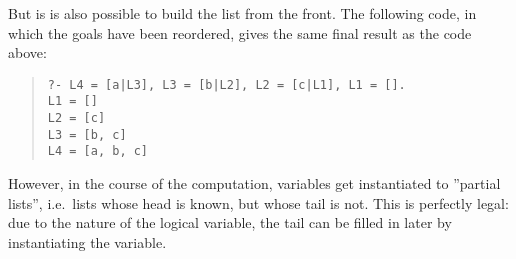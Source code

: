 But is is also possible to build the list from the front.
The following code, in which the goals have been reordered,
gives the same final result as the code above:
\begin{quote}\begin{verbatim}
?- L4 = [a|L3], L3 = [b|L2], L2 = [c|L1], L1 = [].
L1 = []
L2 = [c]
L3 = [b, c]
L4 = [a, b, c]
\end{verbatim}\end{quote}
However, in the course of the computation, variables get instantiated to
''partial lists'', i.e.\ lists whose head is known, but whose tail is not.
This is perfectly legal: due to the nature of the logical variable, the
tail can be filled in later by instantiating the variable.


%
%


